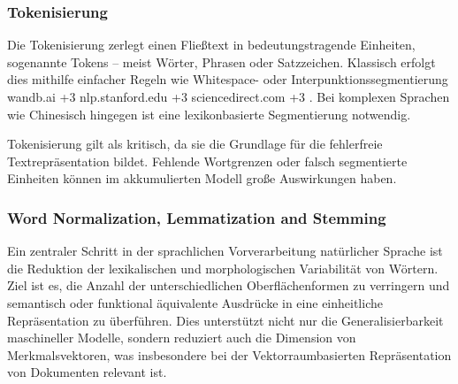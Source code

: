\subsubsection{Tokenisierung}

Die Tokenisierung zerlegt einen Fließtext in bedeutungstragende Einheiten, sogenannte Tokens – meist Wörter, Phrasen oder Satzzeichen. Klassisch erfolgt dies mithilfe einfacher Regeln wie Whitespace- oder Interpunktionssegmentierung
wandb.ai
+3
nlp.stanford.edu
+3
sciencedirect.com
+3
. Bei komplexen Sprachen wie Chinesisch hingegen ist eine lexikonbasierte Segmentierung notwendig.

Tokenisierung gilt als kritisch, da sie die Grundlage für die fehlerfreie Textrepräsentation bildet. Fehlende Wortgrenzen oder falsch segmentierte Einheiten können im akkumulierten Modell große Auswirkungen haben.

\subsubsection{Word Normalization, Lemmatization and Stemming}

Ein zentraler Schritt in der sprachlichen Vorverarbeitung natürlicher Sprache ist die Reduktion der lexikalischen und morphologischen Variabilität von Wörtern. Ziel ist es, die Anzahl der unterschiedlichen Oberflächenformen zu verringern und semantisch oder funktional äquivalente Ausdrücke in eine einheitliche Repräsentation zu überführen. Dies unterstützt nicht nur die Generalisierbarkeit maschineller Modelle, sondern reduziert auch die Dimension von Merkmalsvektoren, was insbesondere bei der Vektorraumbasierten Repräsentation von Dokumenten relevant ist.



